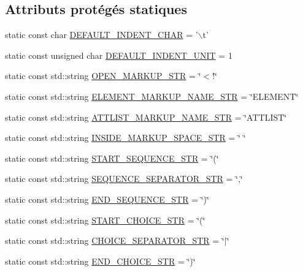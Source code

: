 \subsection*{Attributs protégés statiques}
\begin{DoxyCompactItemize}
\item 
static const char \hyperlink{classdtd_1_1_output_d_t_d_visitor_af8b2c8e68ec262f98a21334900cb09df}{DEFAULT\_\-INDENT\_\-CHAR} = '$\backslash$t'
\item 
static const unsigned char \hyperlink{classdtd_1_1_output_d_t_d_visitor_a7795d56eeb6ab2e68c8d3a43e1c6f487}{DEFAULT\_\-INDENT\_\-UNIT} = 1
\item 
static const std::string \hyperlink{classdtd_1_1_output_d_t_d_visitor_aac75a1ed1d3189d021a65c5d56d1527e}{OPEN\_\-MARKUP\_\-STR} = \char`\"{}$<$!\char`\"{}
\item 
static const std::string \hyperlink{classdtd_1_1_output_d_t_d_visitor_a14cd0eb333af784f38e3441c8fd1b97d}{ELEMENT\_\-MARKUP\_\-NAME\_\-STR} = \char`\"{}ELEMENT\char`\"{}
\item 
static const std::string \hyperlink{classdtd_1_1_output_d_t_d_visitor_a4ce2c50f68b4f167879b57e970ca662c}{ATTLIST\_\-MARKUP\_\-NAME\_\-STR} = \char`\"{}ATTLIST\char`\"{}
\item 
static const std::string \hyperlink{classdtd_1_1_output_d_t_d_visitor_a32ceb547a079fa2498ff14d1aef6e112}{INSIDE\_\-MARKUP\_\-SPACE\_\-STR} = \char`\"{} \char`\"{}
\item 
static const std::string \hyperlink{classdtd_1_1_output_d_t_d_visitor_a1b325fb88f176ce92e566fe4e6423c1c}{START\_\-SEQUENCE\_\-STR} = \char`\"{}(\char`\"{}
\item 
static const std::string \hyperlink{classdtd_1_1_output_d_t_d_visitor_acfffbc0db723271579d1fd87dc699b05}{SEQUENCE\_\-SEPARATOR\_\-STR} = \char`\"{},\char`\"{}
\item 
static const std::string \hyperlink{classdtd_1_1_output_d_t_d_visitor_a17ea023b24838b7b2a96fe56a2c574ea}{END\_\-SEQUENCE\_\-STR} = \char`\"{})\char`\"{}
\item 
static const std::string \hyperlink{classdtd_1_1_output_d_t_d_visitor_ae66777110076859a443e00a9da55ff1b}{START\_\-CHOICE\_\-STR} = \char`\"{}(\char`\"{}
\item 
static const std::string \hyperlink{classdtd_1_1_output_d_t_d_visitor_a686bb62aed37769865a688fe50e55f0a}{CHOICE\_\-SEPARATOR\_\-STR} = \char`\"{}$|$\char`\"{}
\item 
static const std::string \hyperlink{classdtd_1_1_output_d_t_d_visitor_ab0306525af8ca54d3279c02a2d79da46}{END\_\-CHOICE\_\-STR} = \char`\"{})\char`\"{}

\end{DoxyCompactItemize}
